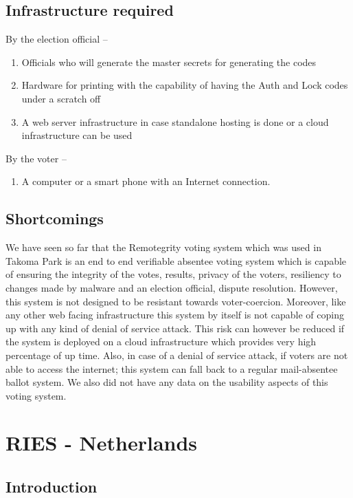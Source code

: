 \subsection{Infrastructure required}

By the election official --
\begin{enumerate}
\item Officials who will generate the master secrets for generating the codes
\item Hardware for printing with the capability of having the Auth and Lock codes under a scratch off
\item A web server infrastructure in case standalone hosting is done or a cloud infrastructure can be used
\end{enumerate}
By the voter --
\begin{enumerate}
  \item A computer or a smart phone with an Internet connection.
\end{enumerate}

\subsection{Shortcomings}

We have seen so far that the Remotegrity voting system which was used in Takoma Park is an end to end verifiable absentee voting system which is capable of ensuring the integrity of the votes, results, privacy of the voters, resiliency to changes made by malware and an election official, dispute resolution. However, this system is not designed to be resistant towards voter-coercion. Moreover, like any other web facing infrastructure this system by itself is not capable of coping up with any kind of denial of service attack. This risk can however be reduced if the system is deployed on a cloud infrastructure which provides very high percentage of up time. Also, in case of a denial of service attack, if voters are not able to access the internet; this system can fall back to a regular mail-absentee ballot system. We also did not have any data on the usability aspects of this voting system.

\section{RIES - Netherlands}

\subsection{Introduction}

